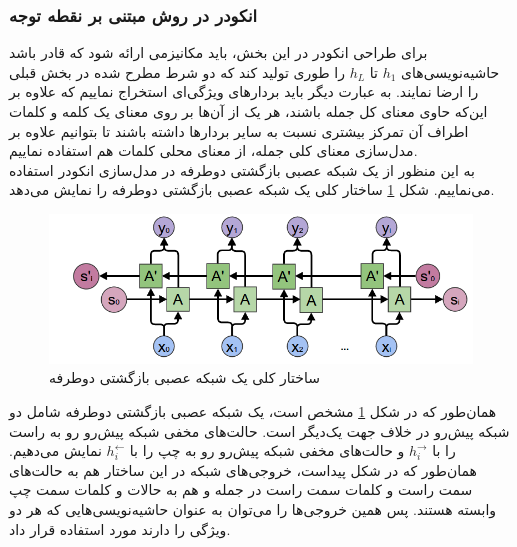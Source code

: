 \subsubsection{انکودر در روش مبتنی بر نقطه توجه}
برای طراحی انکودر در این بخش، باید مکانیزمی ارائه شود که قادر باشد حاشیه‌نویسی‌های $h_1$ تا $h_L$ را طوری تولید کند که دو شرط مطرح شده در بخش قبلی را ارضا نمایند. به عبارت دیگر باید بردارهای ویژگی‌ای استخراج نماییم که علاوه بر این‌که حاوی معنای کل جمله باشند، هر یک از آن‌ها بر روی معنای یک کلمه و کلمات اطراف آن تمرکز بیشتری نسبت به سایر بردارها داشته باشند تا بتوانیم علاوه بر مدل‌سازی معنای کلی جمله، از معنای محلی کلمات هم استفاده نماییم.
\\
به این منظور از یک شبکه عصبی بازگشتی دوطرفه در مدل‌سازی انکودر استفاده می‌نماییم. شکل \ref{fig:biencoder} ساختار کلی یک شبکه عصبی بازگشتی دوطرفه را نمایش می‌دهد. 

\begin{figure}[h]
\centering
\includegraphics[scale=0.6]{Imgs/biencoder.png}
\caption{ساختار کلی یک شبکه عصبی بازگشتی دوطرفه}
\label{fig:biencoder}
\end{figure}

همان‌طور که در شکل \ref{fig:biencoder} مشخص است، یک شبکه عصبی بازگشتی دوطرفه شامل دو شبکه پیش‌رو در خلاف جهت یک‌دیگر است. حالت‌های مخفی شبکه پیش‌رو رو به راست را با $h_i^\rightarrow$ و حالت‌های مخفی شبکه پیش‌رو رو به چپ را با $h_i^\leftarrow$ نمایش می‌دهیم. همان‌طور که در شکل پیداست، خروجی‌های شبکه در این ساختار هم به حالت‌های سمت راست و کلمات سمت راست در جمله و هم به حالات و کلمات سمت چپ وابسته هستند. پس همین خروجی‌ها را می‌توان به عنوان حاشیه‌نویسی‌هایی که هر دو ویژگی را دارند مورد استفاده قرار داد.
	











